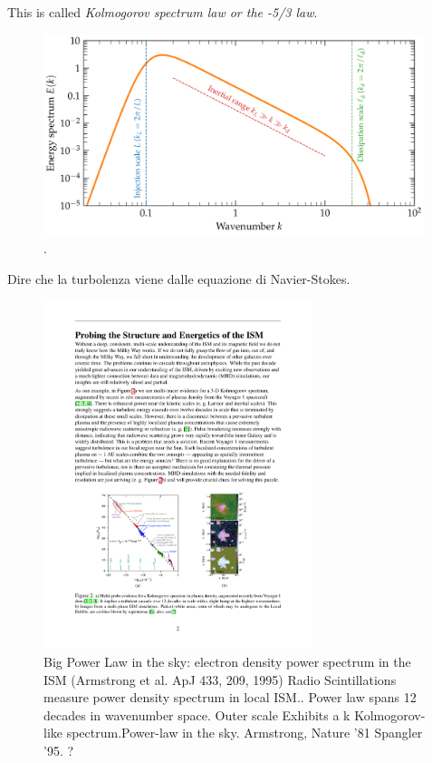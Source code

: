 This is called \emph{Kolmogorov spectrum law or the -5/3 law}. 

\begin{figure}[t] 
\centering 
\includegraphics[width=0.99\textwidth]{figures/kolmogorov_cascade_schematic.pdf} 
\caption{.} 
\label{fig:kolmorogov} 
\end{figure}


{\color{red}Dire che la turbolenza viene dalle equazione di Navier-Stokes.}

\begin{figure}[t] 
\centering 
\includegraphics[width=0.7\textwidth]{figures/ism_turbulence.pdf}
\caption{Big Power Law in the sky: electron density power spectrum in the ISM  (Armstrong et al. ApJ 433, 209, 1995) Radio Scintillations measure power
density spectrum in local ISM.. Power law spans 12 decades in
wavenumber space.
Outer
scale
Exhibits a k Kolmogorov-like
spectrum.Power-law in the sky. Armstrong, Nature '81 Spangler '95. ?} 
\label{fig:ismturbulence} 
\end{figure}

